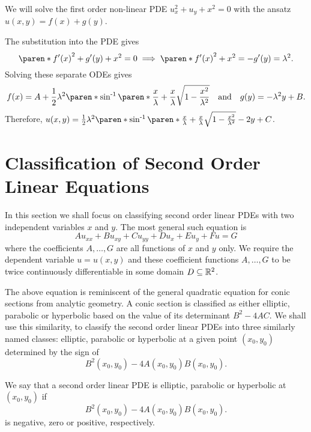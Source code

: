 \documentclass[11pt]{penrose}
\begin{document}
\begin{negg}
    We will solve the first order non-linear PDE $u_x^2 + u_y + x^2 = 0$ with the ansatz $u(x,y) = f(x) + g(y)$.

    The substitution into the PDE gives
    \begin{equation}
        \paren*{f'(x)}^2 + g'(y) + x^2 = 0
        \implies
        \paren*{f'(x)}^2 + x^2 = - g'(y) = \lambda^2.
    \end{equation}
    Solving these separate ODEs gives
    \begin{equation}
        f(x) = A + \frac{1}{2} \lambda^2 \paren*{ \asin\paren*{\frac{x}{\lambda}} + \frac{x}{\lambda}\sqrt{1 - \frac{x^2}{\lambda^2}} }
        \quad\text{and}\quad
        g(y) = -\lambda^2 y + B.
    \end{equation}
    Therefore, $u(x,y) = \frac{1}{2} \lambda^2 \paren*{ \asin\paren*{\frac{x}{\lambda}} + \frac{x}{\lambda}\sqrt{1 - \frac{x^2}{\lambda^2}} -2y }  + C$.
\end{negg}

\section{Classification of Second Order Linear Equations}
In this section we shall focus on classifying second order linear PDEs with two independent variables $x$ and $y$. The most general such equation is
\begin{equation}
    A u_{xx} + B u_{xy} + C u_{yy} + D u_x + E u_y + F u = G
\end{equation}
where the coefficients $A, \dots, G$ are all functions of $x$ and $y$ only. We require the dependent variable $u = u(x,y)$ and these coefficient functions $A, \dots, G$ to be twice continuously differentiable in some domain $D \subseteq \mathbb{R}^2$.

The above equation is reminiscent of the general quadratic equation for conic sections from analytic geometry. A conic section is classified as either elliptic, parabolic or hyperbolic based on the value of its determinant $B^2 - 4AC$. We shall use this similarity, to classify the second order linear PDEs into three similarly named classes: elliptic, parabolic or hyperbolic at a given point $(x_0, y_0)$ determined by the sign of
\begin{equation}
    B^2(x_0, y_0) - 4 A(x_0, y_0) B(x_0, y_0).
\end{equation}

We say that a second order linear PDE is elliptic, parabolic or hyperbolic at $(x_0, y_0)$ if
\begin{equation}
    B^2(x_0, y_0) - 4 A(x_0, y_0) B(x_0, y_0).
\end{equation}
is negative, zero or positive, respectively.
\end{document}

